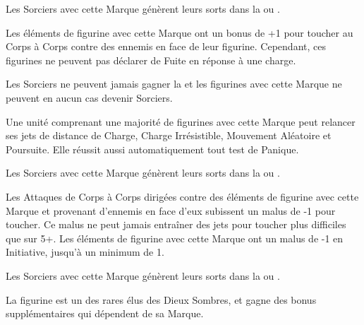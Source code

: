 Les Sorciers avec cette Marque génèrent leurs sorts dans la \Pathof{} \alchemy{} ou \change{}.
\markclosesidetext{}\hfill{}

\spacebetweenmarks{}

\hfill\markstartsidetext{\markofwrath}
Les éléments de figurine avec cette Marque ont un bonus de +1 pour toucher au Corps à Corps contre des ennemis en face de leur figurine. Cependant, ces figurines ne peuvent pas déclarer de Fuite en réponse à une charge.

Les Sorciers ne peuvent jamais gagner la \markofwrath{} et les figurines avec cette Marque ne peuvent en aucun cas devenir Sorciers.
\markclosesidetext{}

\spacebetweenmarks{}

\markstartsidetext{\markoflust}
Une unité comprenant une majorité de figurines avec cette Marque peut relancer ses jets de distance de Charge, Charge Irrésistible, Mouvement Aléatoire et Poursuite. Elle réussit aussi automatiquement tout test de Panique.

Les Sorciers avec cette Marque génèrent leurs sorts dans la \Pathof{} \lust{} ou \shadows{}.
\markclosesidetext{}\hfill{}

\spacebetweenmarks{}

\hfill\markstartsidetext{\markofpestilence}
Les Attaques de Corps à Corps dirigées contre des éléments de figurine avec cette Marque et provenant d'ennemis en face d'eux subissent un malus de -1 pour toucher. Ce malus ne peut jamais entraîner des jets pour toucher plus difficiles que sur 5+. Les éléments de figurine avec cette Marque ont un malus de -1 en Initiative, jusqu'à un minimum de 1.

Les Sorciers avec cette Marque génèrent leurs sorts dans la \Pathof{} \disease{} ou \death{}.
\markclosesidetext{}

\spacebetweenmarks{}


\newpage
\armyspecialruleentry{\chosenofthegods}

La figurine est un des rares élus des Dieux Sombres, et gagne des bonus supplémentaires qui dépendent de sa Marque.

